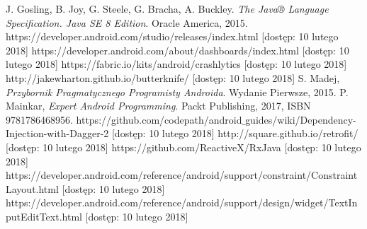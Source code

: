 \documentclass[twoside]{projektInzynierskiMS}
\begin{document}
\begin{thebibliography}{12}
 J. Gosling, B. Joy, G. Steele, G. Bracha, A. Buckley. \textit{The Java® Language Specification. Java SE 8 Edition}. Oracle America, 2015.
 https://developer.android.com/studio/releases/index.html [dostęp: 10 lutego 2018]
 https://developer.android.com/about/dashboards/index.html [dostęp: 10 lutego 2018]
 https://fabric.io/kits/android/crashlytics [dostęp: 10 lutego 2018]
 http://jakewharton.github.io/butterknife/ [dostęp: 10 lutego 2018]
 S. Madej, \textit{Przybornik Pragmatycznego Programisty
Androida}. Wydanie Pierwsze, 2015.
 P. Mainkar, \textit{Expert Android Programming}. Packt Publishing, 2017, ISBN 9781786468956.
 https://github.com/codepath/android$\_$guides/wiki/Dependency-Injection-with-Dagger-2 [dostęp: 10 lutego 2018]
 http://square.github.io/retrofit/ [dostęp: 10 lutego 2018]
 https://github.com/ReactiveX/RxJava [dostęp: 10 lutego 2018]
 https://developer.android.com/reference/android/support/constraint/ConstraintLayout.html [dostęp: 10 lutego 2018]
 https://developer.android.com/reference/android/support/design/widget/TextInputEditText.html [dostęp: 10 lutego 2018]

\end{thebibliography}
\end{document}
